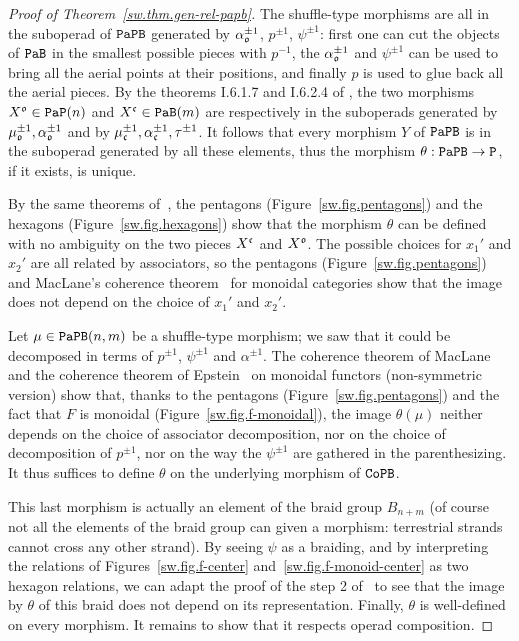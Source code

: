 \begin{proof}[Proof of Theorem~\ref{sw.thm.gen-rel-papb}]
  The shuffle-type morphisms are all in the suboperad of $\mathtt{PaPB}$ generated by $\alpha_{\mathfrak{o}}^{\pm 1}$, $p^{\pm 1}$, $\psi^{\pm 1}$: first one can cut the objects of $\mathtt{PaB}$ in the smallest possible pieces with $p^{-1}$, the $\alpha_{\mathfrak{o}}^{\pm 1}$ and $\psi^{\pm 1}$ can be used to bring all the aerial points at their positions, and finally $p$ is used to glue back all the aerial pieces.
  By the theorems I.6.1.7 and I.6.2.4 of \cite{Fresse2017}, the two morphisms $X^{\mathfrak{o}} \in \mathtt{PaP}(n)$ and $X^{\mathfrak{c}} \in \mathtt{PaB}(m)$ are respectively in the suboperads generated by $\mu_{\mathfrak{o}}^{\pm 1}, \alpha_{\mathfrak{o}}^{\pm 1}$ and by $\mu_{\mathfrak{c}}^{\pm 1}, \alpha_{\mathfrak{c}}^{\pm 1}, \tau^{\pm 1}$.
  It follows that every morphism $Y$ of $\mathtt{PaPB}$ is in the suboperad generated by all these elements, thus the morphism $\theta : \mathtt{PaPB} \to \mathtt{P}$, if it exists, is unique.

  By the same theorems of~\cite{Fresse2017}, the pentagons (Figure~\ref{sw.fig.pentagons}) and the hexagons (Figure~\ref{sw.fig.hexagons}) show that the morphism $\theta$ can be defined with no ambiguity on the two pieces $X^{\mathfrak{c}}$ and $X^{\mathfrak{o}}$.
  The possible choices for $x_{1}'$ and $x_{2}'$ are all related by associators, so the pentagons (Figure~\ref{sw.fig.pentagons}) and MacLane's coherence theorem~\cite{Mac1998} for monoidal categories show that the image does not depend on the choice of $x_{1}'$ and $x_{2}'$.

  Let $\mu \in \mathtt{PaPB}(n,m)$ be a shuffle-type morphism; we saw that it could be decomposed in terms of $p^{\pm 1}$, $\psi^{\pm 1}$ and $\alpha^{\pm 1}$.
  The coherence theorem of MacLane~\cite{Mac1998} and the coherence theorem of Epstein~\cite{Epstein1966} on monoidal functors (non\hyp{}symmetric version) show that, thanks to the pentagons (Figure~\ref{sw.fig.pentagons}) and the fact that $F$ is monoidal (Figure~\ref{sw.fig.f-monoidal}), the image $\theta(\mu)$ neither depends on the choice of associator decomposition, nor on the choice of decomposition of $p^{\pm 1}$, nor on the way the $\psi^{\pm 1}$ are gathered in the parenthesizing.
  It thus suffices to define $\theta$ on the underlying morphism of $\mathtt{CoPB}$.

  This last morphism is actually an element of the braid group $B_{n+m}$ (of course not all the elements of the braid group can given a morphism: terrestrial strands cannot cross any other strand).
  By seeing $\psi$ as a braiding, and by interpreting the relations of Figures~\ref{sw.fig.f-center} and~\ref{sw.fig.f-monoid-center} as two hexagon relations, we can adapt the proof of the step 2 of~\cite[Theorem 6.2.4]{Fresse2017} to see that the image by $\theta$ of this braid does not depend on its representation.
  Finally, $\theta$ is well-defined on every morphism.
  It remains to show that it respects operad composition.


\end{proof}
